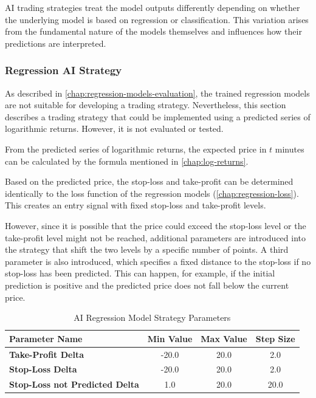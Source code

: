 AI trading strategies treat the model outputs differently depending on whether the underlying model is based on regression or classification.
This variation arises from the fundamental nature of the models themselves and influences how their predictions are interpreted.

\subsubsection{Regression AI Strategy}
\label{chap:regression-ai-stategy}

As described in \autoref{chap:regression-models-evaluation}, the trained regression models are not suitable for developing a trading strategy.
Nevertheless, this section describes a trading strategy that could be implemented using a predicted series of logarithmic returns.
However, it is not evaluated or tested.

From the predicted series of logarithmic returns, the expected price in $t$ minutes can be calculated by the formula mentioned in \autoref{chap:log-returns}.

Based on the predicted price, the stop-loss and take-profit can be determined identically to the loss function of the regression models (\autoref{chap:regression-loss}).
This creates an entry signal with fixed stop-loss and take-profit levels.

However, since it is possible that the price could exceed the stop-loss level or the take-profit level might not be reached, additional parameters are introduced into the strategy that shift the two levels by a specific number of points.
A third parameter is also introduced, which specifies a fixed distance to the stop-loss if no stop-loss has been predicted.
This can happen, for example, if the initial prediction is positive and the predicted price does not fall below the current price.

\begin{table}[H]
    \centering
    \begin{tabular}{L{4cm}ccc}
        \toprule
        \textbf{Parameter Name} & Min Value & Max Value & Step Size
        \\
        \midrule
        \textbf{Take-Profit Delta}             & -20.0 & 20.0 & 2.0  \\
        \textbf{Stop-Loss Delta}               & -20.0 & 20.0 & 2.0  \\
        \textbf{Stop-Loss not Predicted Delta} & 1.0   & 20.0 & 20.0 \\
        \bottomrule
    \end{tabular}
    \caption{AI Regression Model Strategy Parameters}
    \label{tbl:regression-strategy-parameters}
\end{table}

